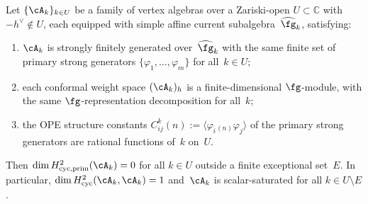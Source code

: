 \begin{theorem}
\label{thm:algebraic-family-rigidity}
Let $\{{\cA}_k\}_{k \in U}$ be a family of vertex algebras
over a Zariski-open $U \subset \mathbb{C}$ with
$-h^\vee \notin U$, each equipped with simple affine current
subalgebra~$\widehat{\fg}_k$, satisfying:
\begin{enumerate}[label=\textup{(\alph*)}]
\item ${\cA}_k$ is strongly finitely generated over~$\widehat{\fg}_k$
  with the same finite set of primary strong generators
  $\{\varphi_1, \ldots, \varphi_m\}$ for all~$k \in U$;
\item each conformal weight space $({\cA}_k)_h$ is a
  finite-dimensional $\fg$-module, with the same
  $\fg$-representation decomposition for all~$k$;
\item[\textup{(c$'$)}] the OPE structure constants
  $C^k_{ij}(n) := \langle \varphi_i{}_{(n)}\varphi_j \rangle$
  of the primary strong generators are rational functions
  of\/~$k$ on~$U$.
\end{enumerate}
Then $\dim H^2_{\mathrm{cyc,prim}}({\cA}_k) = 0$ for all
$k \in U$ outside a finite exceptional set~$E$.
In particular, $\dim H^2_{\mathrm{cyc}}({\cA}_k, {\cA}_k) = 1$
and\/~${\cA}_k$ is scalar-saturated for all $k \in U \setminus E$.
\end{theorem}

